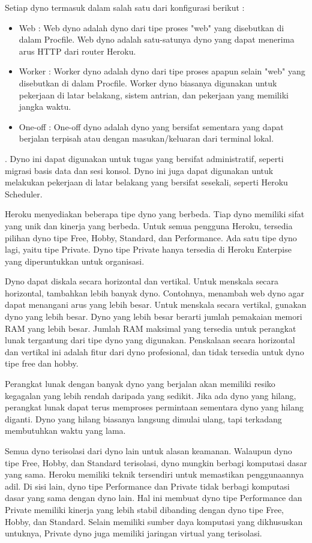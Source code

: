 Setiap dyno termasuk dalam salah satu dari konfigurasi berikut :
\begin{itemize}
\item Web : Web dyno adalah dyno dari tipe proses "web" yang disebutkan di dalam Procfile. Web dyno adalah satu-satunya dyno yang dapat menerima arus HTTP dari router Heroku.
\item Worker : Worker dyno adalah dyno dari tipe proses apapun selain "web" yang disebutkan di dalam Procfile. Worker dyno biasanya digunakan untuk pekerjaan di latar belakang, sistem antrian, dan pekerjaan yang memiliki jangka waktu.
\item One-off : One-off dyno adalah dyno yang bersifat sementara yang dapat berjalan terpisah atau dengan masukan/keluaran dari terminal lokal.
\end{itemize}. Dyno ini dapat digunakan untuk tugas yang bersifat administratif, seperti migrasi basis data dan sesi konsol. Dyno ini juga dapat digunakan untuk melakukan pekerjaan di latar belakang yang bersifat sesekali, seperti Heroku Scheduler.

Heroku menyediakan beberapa tipe dyno yang berbeda. Tiap dyno memiliki sifat yang unik dan kinerja yang berbeda. Untuk semua pengguna Heroku, tersedia pilihan dyno tipe Free, Hobby, Standard, dan Performance. Ada satu tipe dyno lagi, yaitu tipe Private. Dyno tipe Private hanya tersedia di Heroku Enterpise yang diperuntukkan untuk organisasi.

Dyno dapat diskala secara horizontal dan vertikal. Untuk menskala secara horizontal, tambahkan lebih banyak dyno. Contohnya, menambah web dyno agar dapat menangani arus yang lebih besar. Untuk menskala secara vertikal, gunakan dyno yang lebih besar. Dyno yang lebih besar berarti jumlah pemakaian memori RAM yang lebih besar. Jumlah RAM maksimal yang tersedia untuk perangkat lunak tergantung dari tipe dyno yang digunakan. Penskalaan secara horizontal dan vertikal ini adalah fitur dari dyno profesional, dan tidak tersedia untuk dyno tipe free dan hobby.

Perangkat lunak dengan banyak dyno yang berjalan akan memiliki resiko kegagalan yang lebih rendah daripada yang sedikit. Jika ada dyno yang hilang, perangkat lunak dapat terus memproses permintaan sementara dyno yang hilang diganti. Dyno yang hilang biasanya langsung dimulai ulang, tapi terkadang membutuhkan waktu yang lama.

Semua dyno terisolasi dari dyno lain untuk alasan keamanan. Walaupun dyno tipe Free, Hobby, dan Standard terisolasi, dyno mungkin berbagi komputasi dasar yang sama. Heroku memiliki teknik tersendiri untuk memastikan penggunaannya adil. Di sisi lain, dyno tipe Performance dan Private tidak berbagi komputasi dasar yang sama dengan dyno lain. Hal ini membuat dyno tipe Performance dan Private memiliki kinerja yang lebih stabil dibanding dengan dyno tipe Free, Hobby, dan Standard. Selain memiliki sumber daya komputasi yang dikhususkan untuknya, Private dyno juga memiliki jaringan virtual yang terisolasi.

